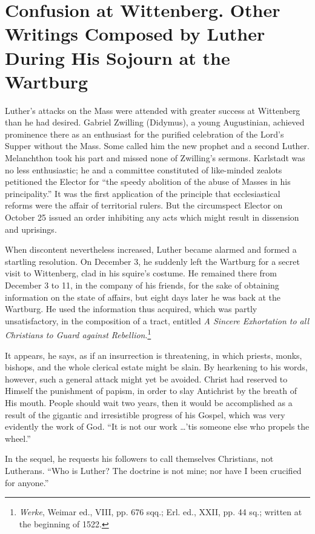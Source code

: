 \section{Confusion at Wittenberg. Other Writings Composed by Luther During His Sojourn at the Wartburg}

Luther’s attacks on the Mass were attended with greater success at
Wittenberg than he had desired. Gabriel Zwilling (Didymus), a
young Augustinian, achieved prominence there as an enthusiast for
the purified celebration of the Lord’s Supper without the Mass. Some
called him the new prophet and a second Luther. Melanchthon took
his part and missed none of Zwilling’s sermons. Karlstadt was no
less enthusiastic; he and a committee constituted of like-minded
zealots petitioned the Elector for “the speedy abolition of the abuse
of Masses in his principality.” It was the first application of the principle
that ecclesiastical reforms were the affair of territorial rulers.
But the circumspect Elector on October 25 issued an order inhibiting
any acts which might result in dissension and uprisings.

When discontent nevertheless increased, Luther became alarmed
and formed a startling resolution. On December 3, he suddenly left
the Wartburg for a secret visit to Wittenberg, clad in his squire’s
costume. He remained there from December 3 to 11, in the company of his
friends, for the sake of obtaining information on the state
of affairs, but eight days later he was back at the Wartburg.
He used the information thus acquired, which was partly unsatisfactory,
in the composition of a tract, entitled \textit{A Sincere Exhortation
to all Christians to Guard against Rebellion}.\footnote
{\textit{Werke}, Weimar ed., VIII, pp. 676 sqq.; Erl. ed., XXII, pp. 44 sq.; written at the
beginning of 1522.}

It appears, he says, as if an insurrection is threatening, in which priests,
monks, bishops, and the whole clerical estate might be slain. By hearkening
to his words, however, such a general attack might yet be avoided. Christ
had reserved to Himself the punishment of papism, in order to slay Antichrist
by the breath of His mouth. People should wait two years, then it
would be accomplished as a result of the gigantic and irresistible progress
of his Gospel, which was very evidently the work of God. “It is not our
work \dots ’tis someone else who propels the wheel.”

In the sequel, he requests his followers to call themselves Christians, not
Lutherans. “Who is Luther? The doctrine is not mine; nor have I been
crucified for anyone.”

